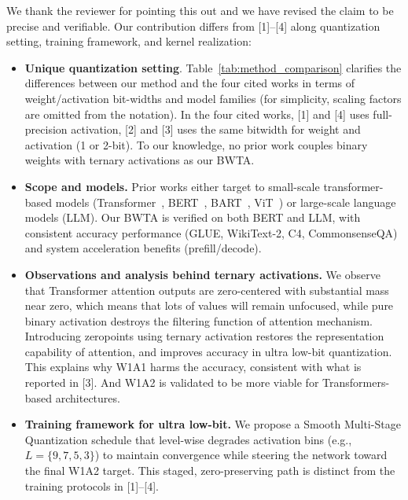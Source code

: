 \begin{revresponse}[]

We thank the reviewer for pointing this out and we have revised the claim to be precise and verifiable. Our contribution differs from [1]–[4] along quantization setting, training framework, and kernel realization:

\begin{itemize}
    \item \textbf{Unique quantization setting}. 
    Table~\ref{tab:method_comparison} clarifies the differences between our method and the four cited works in terms of weight/activation bit-widths and model families (for simplicity, scaling factors are omitted from the notation). In the four cited works, [1] and [4] uses full-precision activation, [2] and [3] uses the same bitwidth for weight and activation (1 or 2-bit). To our knowledge, no prior work couples binary weights with ternary activations as our BWTA. 

    \item \textbf{Scope and models.} Prior works either target to small-scale transformer-based models (Transformer~\cite{chung-etal-2020-extremely}, BERT~\cite{liu2022bit}, BART~\cite{liu-2023-binary-and-ternary-nlg}, ViT~\cite{binaryvit}) or large-scale language models (LLM). Our BWTA is verified on both BERT and LLM, with consistent accuracy performance (GLUE, WikiText-2, C4, CommonsenseQA) and system acceleration benefits (prefill/decode). 
    
    \item \textbf{Observations and analysis behind ternary activations.}  We observe that Transformer attention outputs are zero-centered with substantial mass near zero, which means that lots of values will remain unfocused, while pure binary activation destroys the filtering function of attention mechanism. Introducing zeropoints using ternary activation restores the representation capability of attention, and improves accuracy in ultra low-bit quantization. This explains why W1A1 harms the accuracy, consistent with what is reported in [3]. And W1A2 is validated to be more viable for Transformers-based architectures. 

    \item \textbf{Training framework for ultra low-bit. } We propose a Smooth Multi-Stage Quantization schedule that level-wise degrades activation bins (e.g., $L=\{9,7,5,3\}$) to maintain convergence while steering the network toward the final W1A2 target. This staged, zero-preserving path is distinct from the training protocols in [1]–[4].


\end{itemize}
\end{revresponse}
